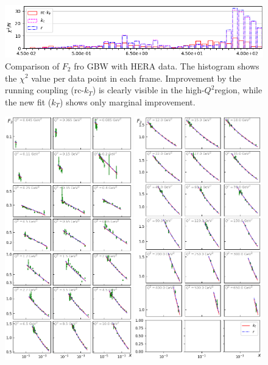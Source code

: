 \documentclass[11pt]{article}
\begin{document}
\begin{figure}[p]
\includegraphics[width=\textwidth]{./plots/Figure_3.png}
\caption{Comparison of $F_2$ fro GBW with HERA data. The histogram shows the
$\chi^2$ value per data point in each frame.  Improvement by the running
coupling (rc-$k_T$) is clearly visible in the high-$Q^2$region, while the new
fit ($k_T$) shows only marginal improvement.}
\label{fig:GBW-Grid}
\end{figure}

\begin{figure}[p]
\includegraphics[width=0.49\textwidth]{./plots/Figure_2-1.png}
\includegraphics[width=0.49\textwidth]{./plots/Figure_2-2.png}

\end{figure}
\end{document}
